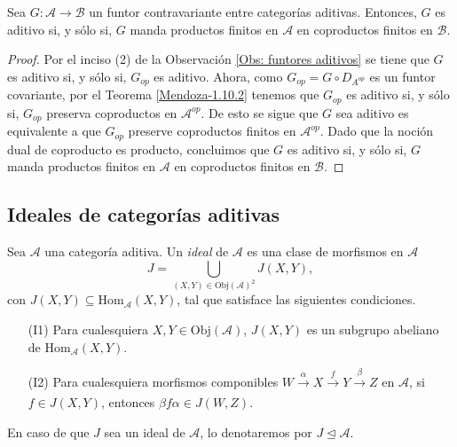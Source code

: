 \documentclass[tesis]{subfiles}
\begin{document}
\begin{Coro}\label{Mendoza-Ejer.53}
    Sea $G: \mathscr{A} \to \mathscr{B}$ un funtor contravariante entre categorías aditivas. Entonces, $G$ es aditivo si, y sólo si, $G$ manda productos finitos en $\mathscr{A}$ en coproductos finitos en $\mathscr{B}$.
\end{Coro}

\begin{proof}

    Por el inciso (2) de la Observación \ref{Obs: funtores aditivos} se tiene que $G$ es aditivo si, y sólo si, $G_{op}$ es aditivo. Ahora, como  $G_{op} = G \circ D_{A^{op}}$ es un funtor covariante, por el Teorema \ref{Mendoza-1.10.2} tenemos que $G_{op}$ es aditivo si, y sólo si, $G_{op}$ preserva coproductos en $\mathscr{A}^{op}.$ De esto se sigue que $G$ sea aditivo es equivalente a que $G_{op}$ preserve coproductos finitos en $\mathscr{A}^{op}$. Dado que la noción dual de coproducto es producto, concluimos que $G$ es aditivo si, y sólo si, $G$ manda productos finitos en $\mathscr{A}$ en coproductos finitos en $\mathscr{B}.$
\end{proof}

\subsection*{Ideales de categorías aditivas} \label{Ssec: Ideales de categorías aditivas}

\begin{Def}\label{Def: Ideal de una categoría aditiva}
    Sea $\mathscr{A}$ una categoría aditiva. Un \emph{ideal} de $\mathscr{A}$ es una clase de morfismos en $\mathscr{A}$
    \[
        J = \bigcup_{(X,Y)\in\text{Obj}(\mathscr{A})^2} J(X,Y),
    \] 
    con $J(X,Y)\subseteq\text{Hom}_\mathscr{A}(X,Y)$, tal que satisface las siguientes condiciones.

    \begin{enumerate}
    
        \item[(I1)] Para cualesquiera $X,Y\in\text{Obj}(\mathscr{A})$, $J(X,Y)$ es un subgrupo abeliano de $\text{Hom}_\mathscr{A}(X,Y)$.

        \item[(I2)] Para cualesquiera morfismos componibles $W\xrightarrow[]{\alpha}X\xrightarrow[]{f}Y\xrightarrow[]{\beta}Z$ en $\mathscr{A}$, si $f\in J(X,Y)$, entonces $\beta f\alpha\in J(W,Z)$.
    \end{enumerate}
    En caso de que $J$ sea un ideal de $\mathscr{A}$, lo denotaremos por $J\trianglelefteq \mathscr{A}$.
\end{Def}
\end{document}
